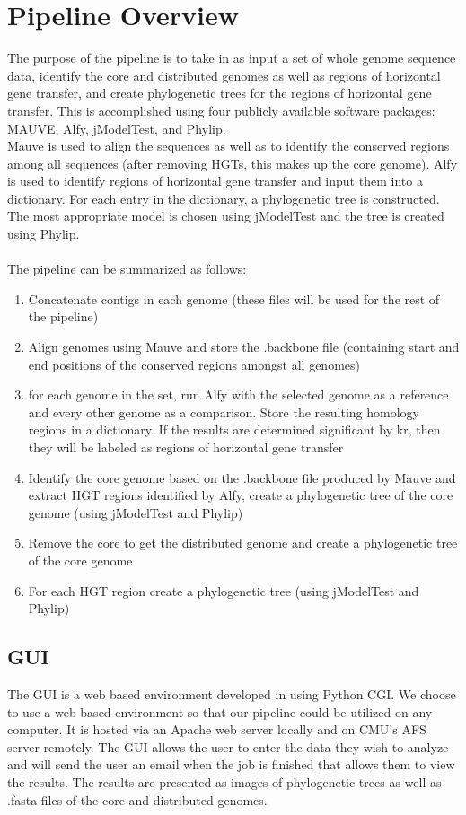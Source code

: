 \documentclass[12pt]{article}
\newcommand{\tab}{\hspace*{3em}}
\begin{document}
\section{Pipeline Overview}
\tab The purpose of the pipeline is to take in as input a set of whole genome sequence data, identify the core and distributed genomes as well as regions of horizontal gene transfer, and create phylogenetic trees for the regions of horizontal gene transfer. This is accomplished using four publicly available software packages: MAUVE, Alfy, jModelTest, and Phylip. \\
\tab Mauve is used to align the sequences as well as to identify the conserved regions among all sequences (after removing HGTs, this makes up the core genome). Alfy is used to identify regions of horizontal gene transfer and input them into a dictionary. For each entry in the dictionary, a phylogenetic tree is constructed. The most appropriate model is chosen using jModelTest and the tree is created using Phylip. \\
\\
The pipeline can be summarized as follows:\\
\begin{enumerate}
\item Concatenate contigs in each genome (these files will be used for the rest of the pipeline)
\item Align genomes using Mauve and store the .backbone file (containing start and end positions of the conserved regions amongst all genomes)
\item for each genome in the set, run Alfy with the selected genome as a reference and every other genome as a comparison. Store the resulting homology regions in a dictionary. If the results are determined significant by kr, then they will be labeled as regions of horizontal gene transfer
\item Identify the core genome based on the .backbone file produced by Mauve and extract HGT regions identified by Alfy, create a phylogenetic tree of the core genome (using jModelTest and Phylip)
\item Remove the core to get the distributed genome and create a phylogenetic tree of the core genome
\item For each HGT region create a phylogenetic tree (using jModelTest and Phylip)
\end{enumerate}

\subsection{GUI}
\tab The GUI is a web based environment developed in using Python CGI. We choose to use a web based environment so that our pipeline could be utilized on any computer. It is hosted via an Apache web server locally and on CMU's AFS server remotely. The GUI allows the user to enter the data they wish to analyze and will send the user an email when the job is finished that allows them to view the results. The results are presented as images of phylogenetic trees as well as .fasta files of the core and distributed genomes. 
\end{document}
